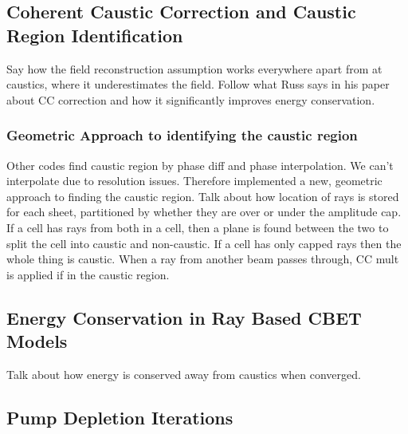 \subsection{Coherent Caustic Correction and Caustic Region Identification}

Say how the field reconstruction assumption works everywhere apart from at caustics, where it underestimates the field.
Follow what Russ says in his paper about CC correction and how it significantly improves energy conservation.

\subsubsection{Geometric Approach to identifying the caustic region}

Other codes find caustic region by phase diff and phase interpolation.
We can't interpolate due to resolution issues.
Therefore implemented a new, geometric approach to finding the caustic region.
Talk about how location of rays is stored for each sheet, partitioned by whether they are over or under the amplitude cap.
If a cell has rays from both in a cell, then a plane is found between the two to split the cell into caustic and non-caustic.
If a cell has only capped rays then the whole thing is caustic.
When a ray from another beam passes through, CC mult is applied if in the caustic region.


\subsection{Energy Conservation in Ray Based CBET Models}

Talk about how energy is conserved away from caustics when converged.

\subsection{Pump Depletion Iterations}
\label{sec:pump_dep_iters}

